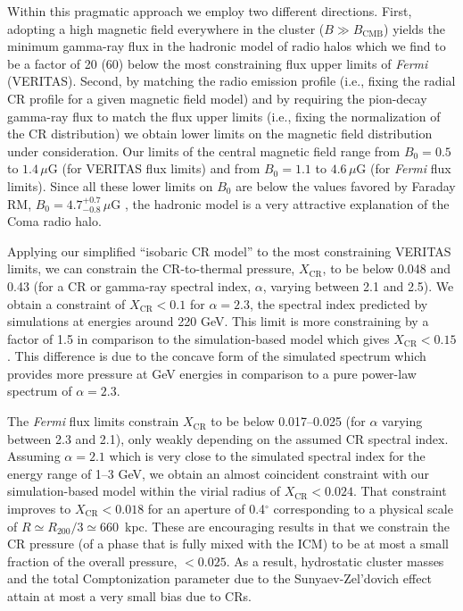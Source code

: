 \documentclass[12pt,manuscript]{aastex}
\newcommand{\rmn}{\mathrm}
\newcommand{\CR}{\mathrm{CR}}
\begin{document}
Within this pragmatic approach we employ two different directions. First, adopting a high magnetic
field everywhere in the cluster ($B\gg B_\rmn{CMB}$) yields the minimum gamma-ray flux in the
hadronic model of radio halos which we find to be a factor of 20 (60) below the most constraining
flux upper limits of {\em Fermi} (VERITAS). Second, by matching the radio emission profile (i.e.,
fixing the radial CR profile for a given magnetic field model) and by requiring the pion-decay
gamma-ray flux to match the flux upper limits (i.e., fixing the normalization of the CR
distribution) we obtain lower limits on the magnetic field distribution under consideration. Our
limits of the central magnetic field range from $B_{0} = 0.5$ to $1.4\,\mu$G (for VERITAS  flux
limits) and from $B_{0} = 1.1$ to $4.6\,\mu$G (for {\em Fermi} flux limits). Since all these lower
limits on $B_0$ are below the values favored by Faraday RM, $B_{0} = 4.7^{+0.7}_{-0.8}\,\mu$G
\citep{article:Bonafede_etal:2010}, the hadronic model is a very attractive explanation of the Coma
radio halo.

Applying our simplified ``isobaric CR model'' to the most constraining VERITAS limits, we can
constrain the CR-to-thermal pressure, $X_\CR$, to be below 0.048 and 0.43 (for a CR or gamma-ray
spectral index, $\alpha$, varying between 2.1 and 2.5). We obtain a constraint of $X_\CR<0.1$ for
$\alpha=2.3$, the spectral index predicted by simulations at energies around 220 GeV.  This limit is
more constraining by a factor of 1.5 in comparison to the simulation-based model which gives
$X_\CR<0.15$. This difference is due to the concave form of the simulated spectrum which provides
more pressure at GeV energies in comparison to a pure power-law spectrum of $\alpha=2.3$.

The {\em Fermi} flux limits constrain $X_\CR$ to be below 0.017--0.025 (for $\alpha$ varying
between 2.3 and 2.1), only weakly depending on the assumed CR spectral index. Assuming $\alpha=2.1$
which is very close to the simulated spectral index for the energy range of 1--3 GeV, we obtain an
almost coincident constraint with our simulation-based model within the virial radius of
$X_\CR<0.024$. That constraint improves to $X_{\CR}<0.018$ for an aperture of 0.4$^\circ$
corresponding to a physical scale of $R \simeq R_{200}/3 \simeq 660$~kpc. These are encouraging
results in that we constrain the CR pressure (of a phase that is fully mixed with the ICM) to be at
most a small fraction of the overall pressure, $<0.025$. As a result, hydrostatic cluster masses
and the total Comptonization parameter due to the Sunyaev-Zel'dovich effect attain at most a very
small bias due to CRs.
\end{document}
